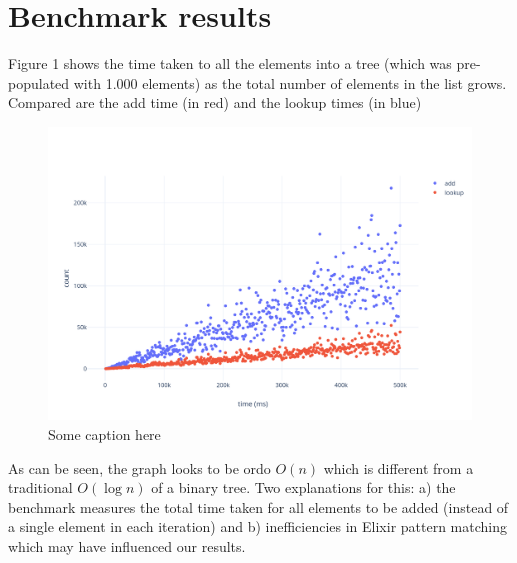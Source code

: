 \section{Benchmark results}
Figure 1 shows the time taken to all the elements into a tree (which was pre-populated with 1.000 elements) as the total number of elements in the list grows. Compared are the add time (in red) and the lookup times (in blue)

\begin{figure}
    \includegraphics[width=\textwidth]{r_benchmark_non_empty_list}
    \caption{Some caption here}
\end{figure}


As can be seen, the graph looks to be ordo $O(n)$ which is different from a traditional $O(\log n)$ of a binary tree. Two explanations for this: a) the benchmark measures the total time taken for all elements to be added (instead of a single element in each iteration) and b) inefficiencies in Elixir pattern matching which may have influenced our results. 